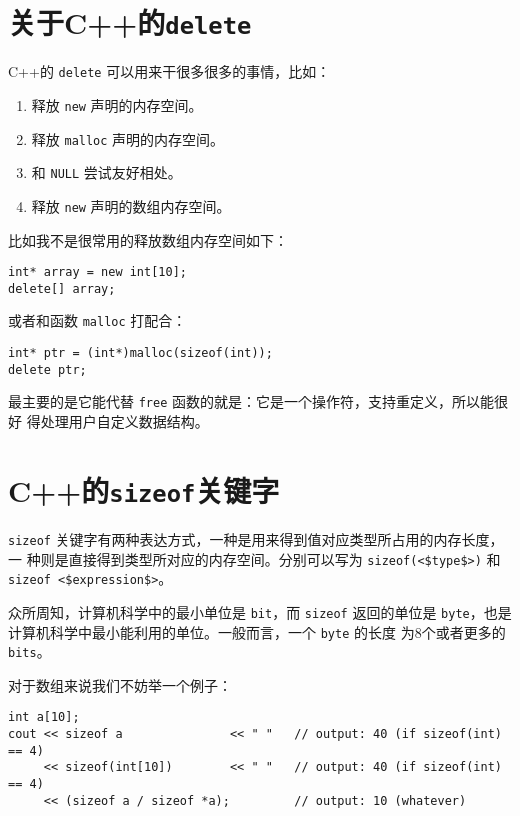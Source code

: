 
\section{关于C++的{\tt delete}}

C++的 \verb|delete| 可以用来干很多很多的事情，比如：
\begin{enumerate}
\item 释放 \verb|new| 声明的内存空间。
\item 释放 \verb|malloc| 声明的内存空间。
\item 和 \verb|NULL| 尝试友好相处。
\item 释放 \verb|new| 声明的数组内存空间。
\end{enumerate}

比如我不是很常用的释放数组内存空间如下：
\begin{lstlisting}
int* array = new int[10];
delete[] array;
\end{lstlisting}

或者和函数 \verb|malloc| 打配合：
\begin{lstlisting}
int* ptr = (int*)malloc(sizeof(int));
delete ptr;
\end{lstlisting}

最主要的是它能代替 \verb|free| 函数的就是：它是一个操作符，支持重定义，所以能很好
得处理用户自定义数据结构。


\section{C++的{\tt sizeof}关键字}

\verb|sizeof| 关键字有两种表达方式，一种是用来得到值对应类型所占用的内存长度，一
种则是直接得到类型所对应的内存空间。分别可以写为 \verb|sizeof(<$type$>)| 和 
\verb|sizeof <$expression$>|。

众所周知，计算机科学中的最小单位是 \verb|bit|，而 \verb|sizeof| 返回的单位是 
\verb|byte|，也是计算机科学中最小能利用的单位。一般而言，一个 \verb|byte| 的长度
为8个或者更多的 \verb|bits|。

对于数组来说我们不妨举一个例子：
\begin{lstlisting}
int a[10];
cout << sizeof a               << " "   // output: 40 (if sizeof(int) == 4)
     << sizeof(int[10])        << " "   // output: 40 (if sizeof(int) == 4)
     << (sizeof a / sizeof *a);         // output: 10 (whatever)
\end{lstlisting}

